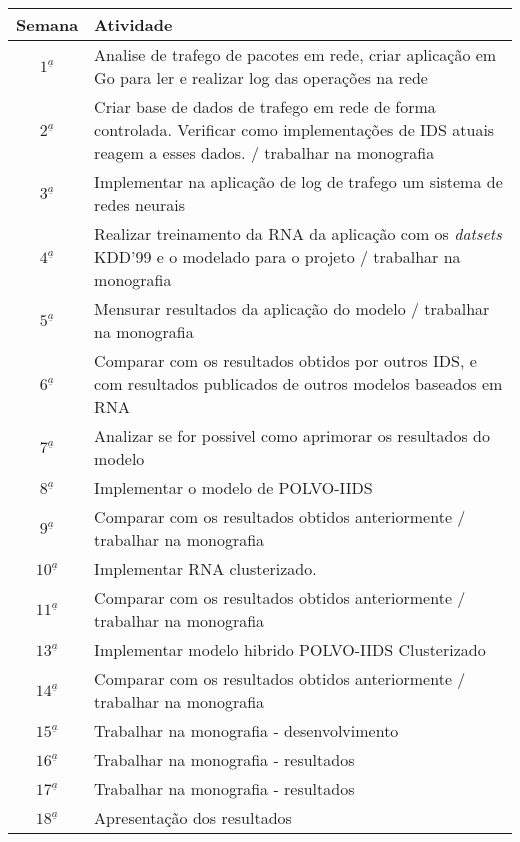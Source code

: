 \documentclass[
	12pt,				%
	openright,			%
	oneside,
	a4paper,			%
	english,			%
	french,				%
	spanish,			%
	brazil				%
	]{abntex2}
\begin{document}
\vspace{.25cm}
\begin{center}
	\begin{tabular}{ |c| p{13.5cm} | }
		\hline
		\textbf{Semana} & \textbf{Atividade} \\ \hline \hline
		$1^{\underline a}$ & Analise de trafego de pacotes em rede, criar aplicação em Go para ler e realizar log das operações na rede \\ \hline
		$2^{\underline a}$ & Criar base de dados de trafego em rede de forma controlada. Verificar como implementações de IDS atuais reagem a esses dados. / trabalhar na monografia \\ \hline
		$3^{\underline a}$ & Implementar na aplicação de log de trafego um sistema de redes neurais \\ \hline		
		$4^{\underline a}$ & Realizar treinamento da RNA da aplicação com os \textit{datsets} KDD'99 e o modelado para o projeto / trabalhar na monografia \\ \hline		
		$5^{\underline a}$ & Mensurar resultados da aplicação do modelo / trabalhar na monografia \\ \hline		
		$6^{\underline a}$ & Comparar com os resultados obtidos por outros IDS, e com resultados publicados de outros modelos baseados em RNA  \\ \hline		
		$7^{\underline a}$ & Analizar se for possivel como aprimorar os resultados do modelo \\ \hline		
		$8^{\underline a}$ & Implementar o modelo de POLVO-IIDS \\ \hline		
		$9^{\underline a}$ & Comparar com os resultados obtidos anteriormente / trabalhar na monografia \\ \hline		
		$10^{\underline a}$ & Implementar RNA clusterizado. \\ \hline		
		$11^{\underline a}$ & Comparar com os resultados obtidos anteriormente / trabalhar na monografia \\ \hline		
		$13^{\underline a}$ & Implementar modelo hibrido POLVO-IIDS Clusterizado \\ \hline		
		$14^{\underline a}$ & Comparar com os resultados obtidos anteriormente / trabalhar na monografia \\ \hline		
		$15^{\underline a}$ & Trabalhar na monografia - desenvolvimento \\ \hline		
		$16^{\underline a}$ & Trabalhar na monografia - resultados \\ \hline		
		$17^{\underline a}$ & Trabalhar na monografia - resultados \\ \hline		
		$18^{\underline a}$ & Apresentação dos resultados \\ \hline
	\end{tabular}
\end{center}
\end{document}
